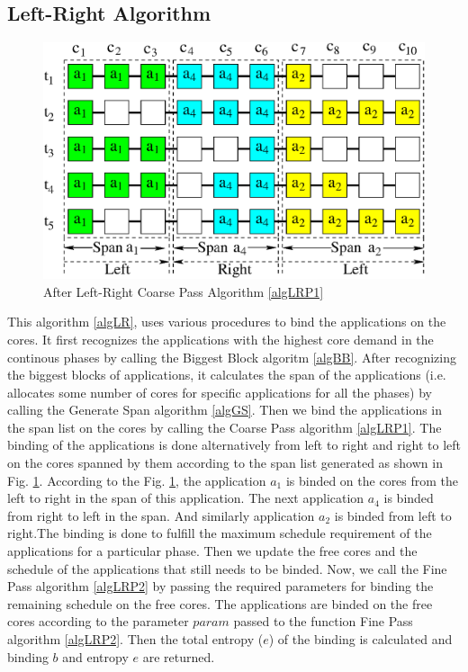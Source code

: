 \documentclass[10pt, conference]{IEEEtran}
\begin{document}
\subsection{Left-Right Algorithm}

\begin{figure}[tb]
\centering 
\includegraphics[scale=0.5]{./figure/left_right.eps}
\vspace{0.0cm}\caption{After Left-Right Coarse Pass Algorithm \ref{algLRP1}}
\vspace{-0.1cm}
\label{figLRP1}
\end{figure}


This algorithm \ref{algLR}, uses various procedures to bind the applications on the cores. It first recognizes the applications with the highest core demand in the continous phases by calling the Biggest Block algoritm \ref{algBB}. After recognizing the biggest blocks of applications, it calculates the span of the applications (i.e. allocates some number of cores for specific applications for all the phases) by calling the Generate Span algorithm \ref{algGS}. Then we bind the applications in the span list on the cores by calling the Coarse Pass algorithm \ref{algLRP1}. The binding of the applications is done alternatively from left to right and right to left on the cores spanned by them according to the span list generated as shown in Fig. \ref{figLRP1}. According to the Fig. \ref{figLRP1}, the application $a_1$ is binded on the cores from the left to right in the span of this application. The next application $a_4$ is binded from right to left in the span. And similarly application $a_2$ is binded from left to right.The binding is done to fulfill the maximum schedule requirement of the applications for a particular phase. Then we update the free cores and the schedule of the applications that still needs to be binded. Now, we call the Fine Pass algorithm \ref{algLRP2} by passing the required parameters for binding the remaining schedule on the free cores. The applications are binded on the free cores according to the parameter $param$ passed to the function Fine Pass algorithm \ref{algLRP2}. Then the total entropy ($e$) of the binding is calculated and binding $b$ and entropy $e$ are returned.
\end{document}
